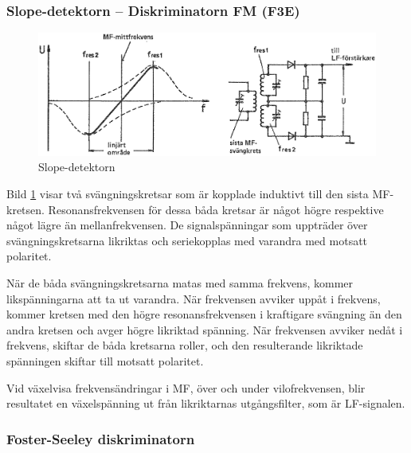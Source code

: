 \subsubsection{Slope-detektorn -- Diskriminatorn FM (F3E)}

\begin{figure}
\includegraphics[width=\textwidth]{images/cropped_pdfs/bild_2_3-59.pdf}
\caption{Slope-detektorn}
\label{fig:BildII3-59}
\end{figure}

Bild \ref{fig:BildII3-59} visar två svängningskretsar som är kopplade induktivt
till den sista MF-kretsen.
Resonansfrekvensen för dessa båda kretsar är något högre respektive något lägre
än mellanfrekvensen.
De signalspänningar som uppträder över svängningskretsarna likriktas och
seriekopplas med varandra med motsatt polaritet.

När de båda svängningskretsarna matas med samma frekvens, kommer
likspänningarna att ta ut varandra.
När frekvensen avviker uppåt i frekvens, kommer kretsen med den högre
resonansfrekvensen i kraftigare svängning än den andra kretsen och avger högre
likriktad spänning.
När frekvensen avviker nedåt i frekvens, skiftar de båda kretsarna roller,
och den resulterande likriktade spänningen skiftar till motsatt polaritet.

Vid växelvisa frekvensändringar i MF, över och under vilofrekvensen, blir
resultatet en växelspänning ut från likriktarnas utgångsfilter, som är
LF-signalen.

\subsubsection{Foster-Seeley diskriminatorn}

